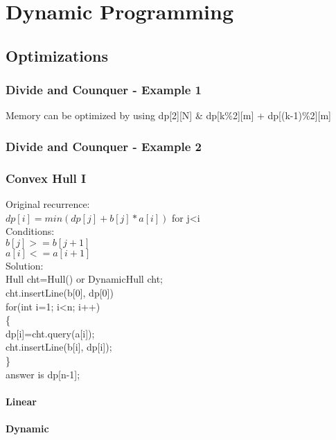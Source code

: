 \documentclass[10pt,a4paper]{report}
\newcommand\tab[1][1cm]{\hspace*{#1}}
\begin{document}
\chapter{Dynamic Programming}

	\section{Optimizations}
		\subsection{Divide and Counquer - Example 1}
			Memory can be optimized by using dp[2][N] \& dp[k\%2][m] + dp[(k-1)\%2][m]\\
			
		\newpage
		\subsection{Divide and Counquer - Example 2}
			
		\newpage
		\subsection{Convex Hull I}
			Original recurrence:\\
			\tab $dp[i]=min(dp[j]+b[j]*a[i])$ for j<i\\
			Conditions:\\
			\tab $b[j]>=b[j+1]$\\
			\tab $a[i]<=a[i+1]$\\
			Solution:\\
			Hull cht=Hull() or DynamicHull cht;\\
			cht.insertLine(b[0], dp[0])\\
			for(int i=1; i<n; i++)\\
			\{\\
				\tab dp[i]=cht.query(a[i]);\\
				\tab cht.insertLine(b[i], dp[i]);\\
			\}\\
			answer is dp[n-1];

			\subsubsection{Linear}
				
			\newpage
			\subsubsection{Dynamic}
				
\end{document}
